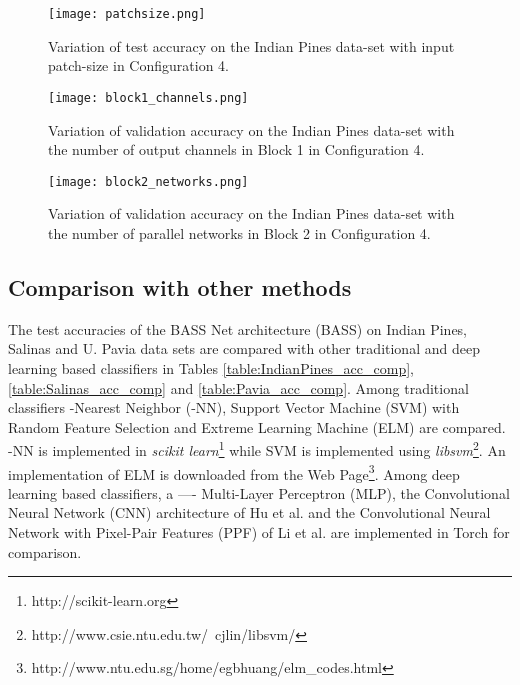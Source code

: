 \documentclass[journal]{IEEEtran}
\begin{document}
\begin{figure}
\centering
	\texttt{[image: patchsize.png]}
	\caption{Variation of test accuracy on the Indian Pines data-set with input patch-size in Configuration 4.}
	\label{fig:patchsize_variation}
\end{figure}

\begin{figure}
\centering
	\texttt{[image: block1\_channels.png]}
	\caption{Variation of validation accuracy on the Indian Pines data-set with the number of output channels in Block 1 in Configuration 4.}
	\label{fig:block1_channels_variation}
\end{figure}

\begin{figure}
\centering
	\texttt{[image: block2\_networks.png]}
	\caption{Variation of validation accuracy on the Indian Pines data-set with the number of parallel networks in Block 2 in Configuration 4.}
	\label{fig:block2_networks_variation}
\end{figure}

\subsection{Comparison with other methods}
\label{sec:comparison}
The test accuracies of the BASS Net architecture (BASS) on Indian Pines, Salinas and U. Pavia data sets are compared with other traditional and deep learning based classifiers in Tables \ref{table:IndianPines_acc_comp}, \ref{table:Salinas_acc_comp} and \ref{table:Pavia_acc_comp}. Among traditional classifiers -Nearest Neighbor (-NN), Support Vector Machine (SVM) with Random Feature Selection \cite{Waske:2010} and Extreme Learning Machine (ELM) \cite{Samat:2014,Li:2015} are compared. -NN is implemented in \textit{scikit learn}\footnote{http://scikit-learn.org} while SVM is implemented using    \textit{libsvm}\footnote{http://www.csie.ntu.edu.tw/~cjlin/libsvm/}. An implementation of ELM is downloaded from the Web Page\footnote{http://www.ntu.edu.sg/home/egbhuang/elm_codes.html}. Among deep learning based classifiers, a ---- Multi-Layer Perceptron (MLP), the Convolutional Neural Network (CNN) architecture of Hu et al. \cite{Hu:2015} and the Convolutional Neural Network with Pixel-Pair Features (PPF) of Li et al. \cite{Li:2016} are implemented in Torch for comparison. \\
\end{document}

